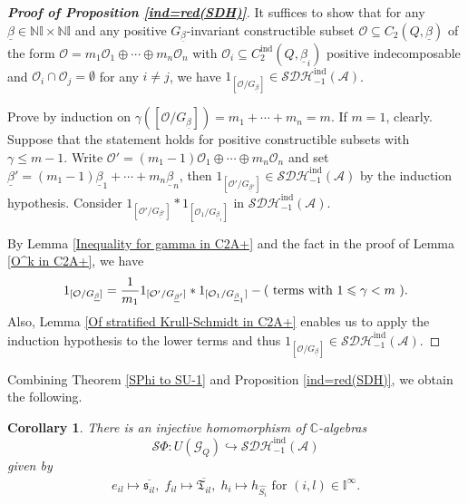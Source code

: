 \documentclass[12pt]{amsart}
\newtheorem{corollary}[theorem]{Corollary}
\theoremstyle{definition}
\numberwithin{equation}{section}
\begin{document}
\begin{proof}[\emph{\textbf{Proof of Proposition \ref{ind=red(SDH)}}}]
    It suffices to show that for any $\underline{\beta} \in \mathbb{N}\mathbb{I} \times \mathbb{N}\mathbb{I} $ and any positive $ G_{\underline{\beta}} $-invariant constructible subset $ \mathcal{O} \subseteq C_2(Q, \underline{\beta}) $ of the form  $ \mathcal{O} = m_1 \mathcal{O}_1 \oplus \cdots \oplus m_n \mathcal{O}_n $ with $ \mathcal{O}_i \subseteq C_2^{\mathrm{ind}}(Q,\underline{\beta}_i) $ positive indecomposable and $ \mathcal{O}_i \cap \mathcal{O}_j = \emptyset $ for any $ i \neq j $, we have $ 1_{[\mathcal{O}/G_{\underline{\beta}}]} \in \mathcal{SDH}^{\mathrm{ind}}_{-1}(\mathcal{A}) $. 

    Prove by induction on $ \gamma([\mathcal{O}/G_{\underline{\beta}}]) = m_1 + \cdots + m_n = m $. 
    If $ m =1 $, clearly. 
    Suppose that the statement holds for positive constructible subsets with $ \gamma \leqslant m-1 $. 
    Write $ \mathcal{O}' = (m_1-1)\mathcal{O}_1 \oplus \cdots \oplus m_n\mathcal{O}_n $ and set $ \underline{\beta}' = (m_1-1)\underline{\beta}_1 + \cdots + m_n \underline{\beta}_n $, then $ 1_{[\mathcal{O}'/G_{\underline{\beta}'}]} \in \mathcal{SDH}^{\mathrm{ind}}_{-1}(\mathcal{A}) $ by the induction hypothesis. 
    Consider $ 1_{[\mathcal{O}'/G_{\underline{\beta}'}]} * 1_{[\mathcal{O}_1/G_{\underline{\beta}_1}]} $ in $  \mathcal{SDH}^{\mathrm{ind}}_{-1}(\mathcal{A}) $. 
    
    By Lemma \ref{Inequality for gamma in C2A+} and the fact in the proof of Lemma \ref{O^k in C2A+}, we have
    \begin{align*}
         1_{[\mathcal{O}/G_{\underline{\beta}}]}= \frac{1}{m_1}{1_{[\mathcal{O}'/G_{\underline{\beta}'}]}} *  1_{[\mathcal{O}_1/G_{\underline{\beta}_1}]} - (\text{ terms with $ 1 \leqslant \gamma <m $ } ).
    \end{align*}
    Also, Lemma \ref{Of stratified Krull-Schmidt in C2A+} enables us to apply the induction hypothesis to the lower terms and thus $ 1_{[\mathcal{O}/G_{\underline{\beta}}]} \in \mathcal{SDH}^{\mathrm{ind}}_{-1}(\mathcal{A}) $. 
    
    

\end{proof}

Combining Theorem \ref{SPhi to SU-1} and Proposition \ref{ind=red(SDH)}, we obtain the following. 
\begin{corollary}
    \label{SPhi to SDHind-1}
    There is an injective homomorphism of $ \mathbb{C} $-algebras
    \[ \mathcal{S}\Phi: U(\mathcal{G}_Q) \hookrightarrow \mathcal{SDH}^{\mathrm{ind}}_{-1}(\mathcal{A}) \]
    given by
    \begin{align*}
        e_{il} \mapsto \overline{\mathfrak{s}_{il}},\; f_{il} \mapsto \overline{\mathfrak{T}_{il}},\; h_i \mapsto h_{\widehat{S_i}} \text{ for } (i,l) \in \mathbb{I}^{\infty}.
    \end{align*}
\end{corollary}



\newpage






\end{document}
